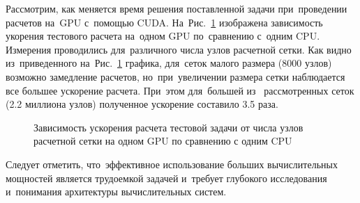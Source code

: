 Рассмотрим, как меняется время решения поставленной задачи при~проведении расчетов на~GPU
с~помощью CUDA. На~Рис.~\ref{cuda_speedup} изображена зависимость укорения тестового расчета на~одном GPU
по~сравнению с~одним CPU. Измерения проводились для~различного числа
узлов расчетной сетки. Как видно из~приведенного на~Рис.~\ref{cuda_speedup}
графика, для~сеток малого размера (8000 узлов) возможно замедление расчетов, но~при~увеличении
размера сетки наблюдается все большее ускорение расчета. При~этом для~большей из~
рассмотренных сеток (2.2 миллиона узлов) полученное ускорение составило 3.5 раза.

\begin{figure}[!ht]
\centering
{}
\caption{Зависимость ускорения расчета тестовой задачи от числа узлов расчетной сетки на одном GPU по сравнению с одним CPU}
\label{cuda_speedup}
\end{figure}

Следует отметить, что~эффективное использование больших вычислительных
мощностей является трудоемкой задачей и~требует глубокого исследования и~понимания
архитектуры вычислительных систем.
